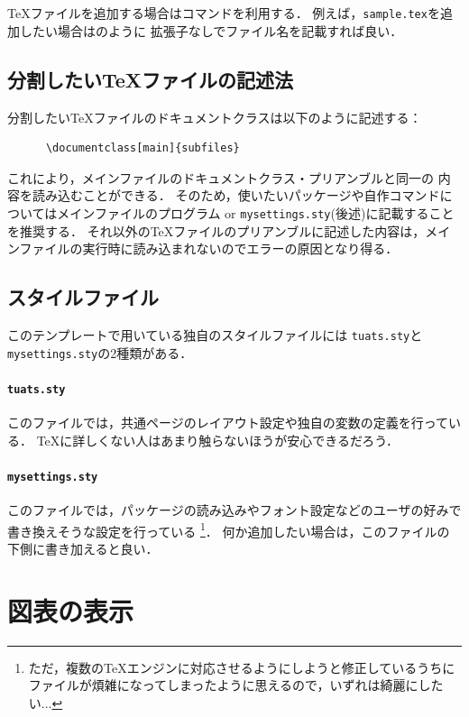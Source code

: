 \documentclass[main]{subfiles}
\begin{document}
\TeX ファイルを追加する場合は\verb||コマンドを利用する．
例えば，\verb|sample.tex|を追加したい場合は\verb||のように
拡張子なしでファイル名を記載すれば良い．

\subsection{分割したい\TeX ファイルの記述法}

分割したい\TeX ファイルのドキュメントクラスは以下のように記述する：
\begin{verbatim}
      \documentclass[main]{subfiles}
\end{verbatim}
これにより，メインファイルのドキュメントクラス・プリアンブルと同一の
内容を読み込むことができる．
そのため，使いたいパッケージや自作コマンドについてはメインファイルのプログラム or \texttt{mysettings.sty}(後述)に記載することを推奨する．
それ以外の\TeX ファイルのプリアンブルに記述した内容は，メインファイルの実行時に読み込まれないのでエラーの原因となり得る．

\subsection{スタイルファイル}

このテンプレートで用いている独自のスタイルファイルには
\texttt{tuats.sty}と\texttt{mysettings.sty}の2種類がある．

\paragraph{\texttt{tuats.sty}}

このファイルでは，共通ページのレイアウト設定や独自の変数の定義を行っている．
\TeX に詳しくない人はあまり触らないほうが安心できるだろう．

\paragraph{\texttt{mysettings.sty}}

このファイルでは，パッケージの読み込みやフォント設定などのユーザの好みで書き換えそうな設定を行っている
\footnote{ただ，複数の\TeX エンジンに対応させるようにしようと修正しているうちにファイルが煩雑になってしまったように思えるので，いずれは綺麗にしたい...}．
何か追加したい場合は，このファイルの下側に書き加えると良い．

\section{図表の表示}
\end{document}
